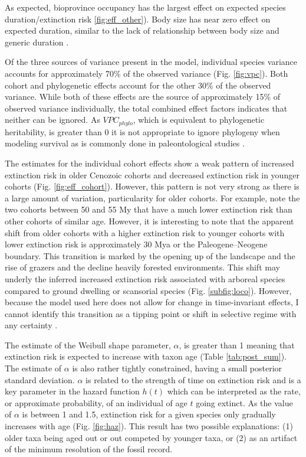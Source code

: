 \documentclass{nature}
\begin{document}
As expected, bioprovince occupancy has the largest effect on expected species duration/extinction risk \ref{fig:eff_other}). Body size has near zero effect on expected duration, similar to the lack of relationship between body size and generic duration \cite{Tomiya2013}. 

Of the three sources of variance present in the model, individual species variance accounts for approximately 70\% of the observed variance (Fig. \ref{fig:vpc}). Both cohort and phylogenetic effects account for the other 30\% of the observed variance. While both of these effects are the source of approximately 15\% of observed variance individually, the total combined effect factors indicates that neither can be ignored. As \(VPC_{phylo}\), which is equivalent to phylogenetic heritability, is greater than 0 it is not appropriate to ignore phylogeny when modeling survival \cite{Housworth2004} as is commonly done in paleontological studies \cite{Alroy2009,Foote2013,Jablonski2006a,Hunt2007a,Liow2008,Payne2007}. 

The estimates for the individual cohort effects show a weak pattern of increased extinction risk in older Cenozoic cohorts and decreased extinction risk in younger cohorts (Fig. \ref{fig:eff_cohort}). However, this pattern is not very strong as there is a large amount of variation, particularity for older cohorts. For example, note the two cohorts between 50 and 55 My that have a much lower extinction risk than other cohorts of similar age. However, it is interesting to note that the apparent shift from older cohorts with a higher extinction risk to younger cohorts with lower extinction risk is approximately 30 Mya or the Paleogene--Neogene boundary. This transition is marked by the opening up of the landscape and the rise of grazers and the decline heavily forested environments. This shift may underly the inferred increased extinction risk associated with arboreal species compared to ground dwelling or scansorial species (Fig. \ref{subfig:loco}). However, because the model used here does not allow for change in time-invariant effects, I cannot identify this transition as a tipping point or shift in selective regime with any certainty \cite{Barnosky2012a,Barnosky2011}.

The estimate of the Weibull shape parameter, \(\alpha\), is greater than 1 meaning that extinction risk is expected to increase with taxon age (Table \ref{tab:post_sum}). The estimate of \(\alpha\) is also rather tightly constrained, having a small posterior standard deviation. \(\alpha\) is related to the strength of time on extinction risk and is a key parameter in the hazard function \(h(t)\) which can be interpreted as the rate, or approximate probability, of an individual of age \(t\) going extinct. As the value of \(\alpha\) is between 1 and 1.5, extinction risk for a given species only gradually increases with age (Fig. \ref{fig:haz}). This result has two possible explanations: (1) older taxa being aged out or out competed by younger taxa, or (2) as an artifact of the minimum resolution of the fossil record.
\end{document}
